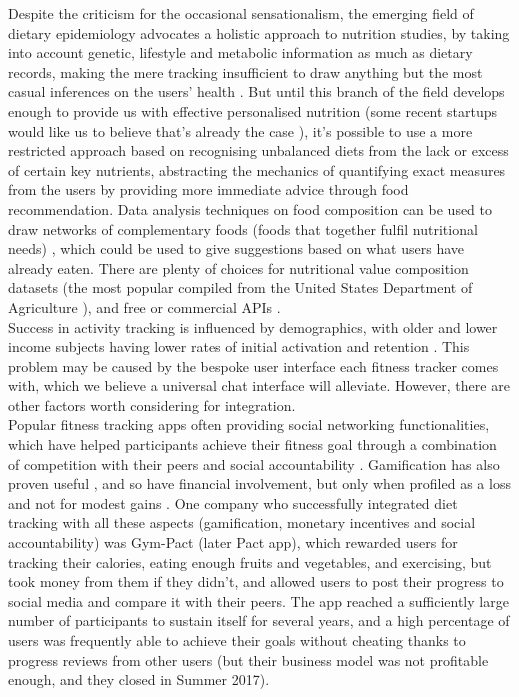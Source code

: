 Despite the criticism for the occasional sensationalism, the emerging field of dietary epidemiology advocates a holistic approach to nutrition studies, by taking into account genetic, lifestyle and metabolic information as much as dietary records, making the mere tracking insufficient to draw anything but the most casual inferences on the users' health \cite{byers2001food}. But until this branch of the field develops enough to provide us with effective personalised nutrition (some recent startups would like us to believe that's already the case \cite{habitwebsite}), it's possible to use a more restricted approach based on recognising unbalanced diets from the lack or excess of certain key nutrients, abstracting the mechanics of quantifying exact measures from the users by providing more immediate advice through food recommendation. Data analysis techniques on food composition can be used to draw networks of complementary foods (foods that together fulfil nutritional needs) \cite{Kim2015a}, which could be used to give suggestions based on what users have already eaten. There are plenty of choices for nutritional value composition datasets (the most popular compiled from the United States Department of Agriculture \cite{usda}), and free or commercial APIs \cite{foodapis}.\\
Success in activity tracking is influenced by demographics, with older and lower income subjects having lower rates of initial activation and retention \cite{Patel2017}. This problem may be caused by the bespoke user interface each fitness tracker comes with, which we believe a universal chat interface will alleviate. However, there are other factors worth considering for integration. \\
Popular fitness tracking apps often providing social networking functionalities, which have helped participants achieve their fitness goal through a combination of competition with their peers and social accountability \cite{chenchen2014}. Gamification has also proven useful \cite{doi:10.1001/jamainternmed.2017.3458}, and so have financial involvement, but only when profiled as a loss and not for modest gains \cite{doi:10.7326/M15-1635}. One company who successfully integrated diet tracking with all these aspects (gamification, monetary incentives and social accountability) was Gym-Pact (later Pact app), which rewarded users for tracking their calories, eating enough fruits and vegetables, and exercising, but took money from them if they didn't, and allowed users to post their progress to social media and compare it with their peers. The app reached a sufficiently large number of participants \cite{nudgingpracticioner} to sustain itself for several years, and a high percentage of users was frequently able to achieve their goals without cheating thanks to progress reviews from other users (but their business model was not profitable enough, and they closed in Summer 2017).
